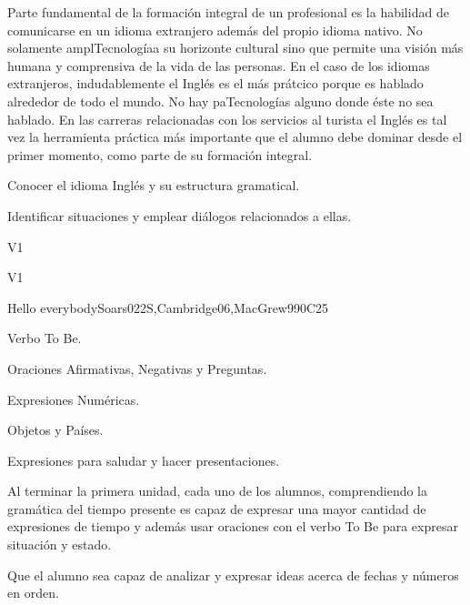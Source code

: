 \begin{syllabus}


\begin{justification}
Parte fundamental de la formación integral de un profesional es la habilidad de comunicarse en un idioma extranjero además del propio idioma nativo. No solamente amplTecnologíaa su horizonte cultural sino que permite una visión más humana y comprensiva de la vida de las personas. En el caso de los idiomas extranjeros, indudablemente el Inglés es el más prátcico porque es hablado alrededor de todo el mundo. No hay paTecnologías alguno donde éste no sea hablado. En las carreras relacionadas con los servicios al turista el Inglés es tal vez la herramienta práctica más importante que el alumno debe dominar desde el primer momento, como parte de su formación integral.
\end{justification}

\begin{goals}
\item Conocer el idioma Inglés y su estructura gramatical.
\item Identificar situaciones y emplear diálogos relacionados a ellas.
\end{goals}

\begin{outcomes}{V1}
\item {}
\end{outcomes}

\begin{competences}{V1}
    \item {}
\end{competences}

\begin{unit}{Hello everybody}{}{Soars022S,Cambridge06,MacGrew99}{0}{C25}
   \begin{topics}
      \item Verbo To Be.
      \item Oraciones Afirmativas, Negativas y Preguntas.
      \item Expresiones Numéricas.
      \item Objetos y Paí­ses.
      \item Expresiones para saludar y hacer presentaciones.
   \end{topics}

   \begin{learningoutcomes}
      \item Al terminar la primera unidad, cada uno de los alumnos, comprendiendo la gramática del tiempo presente es capaz de expresar una mayor cantidad de expresiones de tiempo y además usar oraciones con el verbo To Be para expresar situación y estado. 
      \item Que el alumno sea capaz de analizar y expresar ideas acerca de fechas y números en orden. 
   \end{learningoutcomes}
\end{unit}


\end{syllabus}

